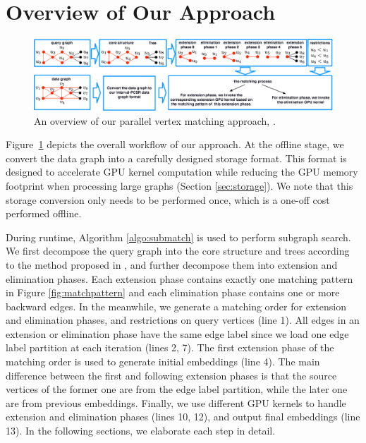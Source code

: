 
\section{Overview of Our Approach}
\begin{figure}
	\centering
	\includegraphics[width=\textwidth]{./figure/approachoverview.eps}
	\caption{An overview of our parallel vertex matching approach, \SystemName.}
	\label{fig:overview}
\end{figure}

Figure~\ref{fig:overview} depicts the overall workflow of our approach. At the offline stage, we convert the data graph into a carefully
designed storage format. This format is designed to accelerate GPU kernel computation while reducing the GPU memory footprint when
processing large graphs (Section \ref{sec:storage}). We note that this storage conversion only needs to be performed once, which is a one-off cost performed offline.

During runtime, Algorithm \ref{algo:submatch} is used to perform subgraph search. We first decompose the query graph into the core structure and trees according to the method proposed in \cite{bi2016efficient}, and further decompose them into extension and elimination phases. Each extension phase contains exactly one matching pattern in Figure \ref{fig:matchpattern} and each elimination phase contains one or more backward edges. In the meanwhile, we generate a matching order for extension and elimination phases, and restrictions on query vertices (line 1). All edges in an extension or elimination phase have the same edge label since we load one edge label partition at each iteration (lines 2, 7). The first extension phase of the matching order is used to generate initial embeddings (line 4). The main difference between the first and following extension phases is that the source vertices of the former one are from the edge label partition, while the later one are from previous embeddings. Finally, we use different GPU kernels to handle extension and elimination phases (lines 10, 12), and output final embeddings (line 13). In the following sections, we elaborate each step in detail.

